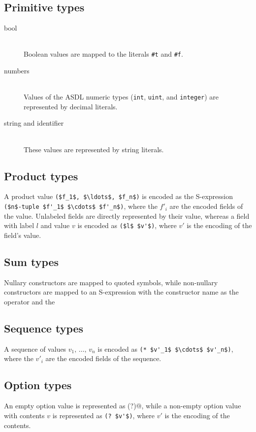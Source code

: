\subsection{Primitive types}

\begin{description}
  \item[bool] \mbox{}\\
    Boolean values are mapped to the literals \lstinline!#t! and \lstinline!#f!.

  \item[numbers] \mbox{}\\
    Values of the ASDL numeric types (\lstinline!int!, \lstinline!uint!, and
    \lstinline!integer!) are represented by decimal literals.

  \item[string and identifier] \mbox{}\\
    These values are represented by string literals.
\end{description}%

\subsection{Product types}
A product value \lstinline[mathescape=true]@($f_1$, $\ldots$, $f_n$)@
is encoded as the
S-expression \lstinline[mathescape=true]@($n$-tuple $f'_1$ $\cdots$ $f'_n$)@,
where the $f'_i$ are the encoded fields of the value.
Unlabeled fields are directly represented by their value, whereas a
field with label $l$ and value $v$ is encoded as
\lstinline[mathescape=true]@($l$ $v'$)@, where $v'$ is the encoding of the field's
value.

\subsection{Sum types}
Nullary constructors are mapped to quoted symbols, while non-nullary constructors are mapped
to an S-expression with the constructor name as the operator and the

\subsection{Sequence types}
A sequence of values $v_1,\,\ldots,\,v_n$ is encoded as
\lstinline[mathescape=true]@(* $v'_1$ $\cdots$ $v'_n$)@,
where the $v'_i$ are the encoded fields of the sequence.

\subsection{Option types}
An empty option value is represented as \lstinline@(?)@, while a non-empty
option value with contents $v$ is represented as \lstinline[mathescape=true]@(? $v'$)@,
where $v'$ is the encoding of the contents.

